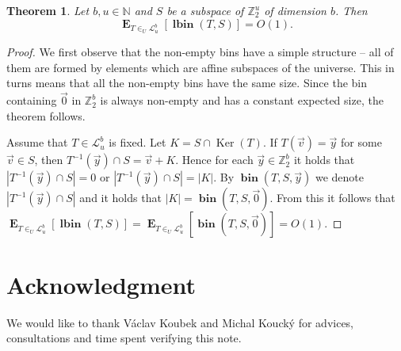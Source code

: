 ﻿\documentclass[review]{elsarticle}
\newcommand{\bin}[3]{\operatorname{\mathbf{bin}}({#1}, {#2}, {#3})}
\newcommand{\lbin}[2]{\operatorname{\mathbf{lbin}}({#1}, {#2})}
\newcommand{\vecspace}[2]{\mathbb{Z}_{#1}^{#2}}
\newcommand{\binvecspace}[1]{\vecspace{2}{#1}}
\newcommand{\linearmaps}[2]{\mathcal{L}_{#1}^{#2}}
\newcommand{\expects}[2]{\operatorname{\mathbf{E}}_{{#1}}\left[{#2}\right]}
\newtheorem{theorem}{Theorem}
\begin{document}
\begin{theorem}
Let $b, u \in \mathbb{N}$ and $S$ be a subspace of $\binvecspace{u}$ of dimension $b$. Then \[ \expects{T \in_U \linearmaps{u}{b}}{\lbin{T}{S}} = O(1).\]
\end{theorem}
\begin{proof}
We first observe that the non-empty bins have a simple structure -- all of them are formed by elements which are affine subspaces of the universe.
This in turns means that all the non-empty bins have the same size.
Since the bin containing $\vec{0}$ in $\binvecspace{b}$ is always non-empty and has a constant expected size, the theorem follows.

Assume that $T \in \linearmaps{u}{b}$ is fixed.
Let $K = S \cap \operatorname{Ker}(T)$.
If $T(\vec{v}) = \vec{y}$ for some $\vec{v} \in S$, then $T^{-1}(\vec y) \cap S = \vec v + K$.
Hence for each $\vec y \in \mathbb{Z}_2^b$ it holds that $|T^{-1}(\vec y) \cap S| = 0$ or $|T^{-1}(\vec y) \cap S| = |K|$.
By $\bin{T}{S}{\vec{y}}$ we denote $|T^{-1}(\vec{y}) \cap S|$ and it holds that $|K| = \bin{T}{S}{\vec 0}$.
From this it follows that 
$
\expects{T\in_U \linearmaps{u}{b}}{\lbin{T}{S}} = \expects{T\in_U \linearmaps{u}{b}}{\bin{T}{S}{\vec 0}} = O(1).
$

\end{proof}

\section{Acknowledgment}

We would like to thank V\'aclav Koubek and Michal Kouck\'y for advices, consultations and time spent verifying this note.



\end{document}
